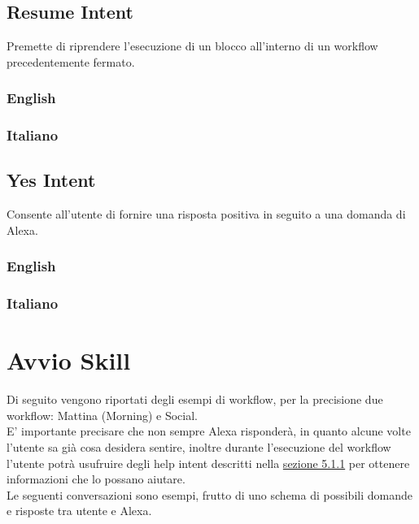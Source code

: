 \subsection{Resume Intent}
Premette di riprendere l'esecuzione di un blocco all'interno di un workflow precedentemente fermato.
\subsubsection{English}
\begin{itemize}
	
	
\end{itemize}

\subsubsection{Italiano}
\begin{itemize}
	
\end{itemize}



\subsection{Yes Intent}
Consente all'utente di fornire una risposta positiva in seguito a una domanda di Alexa.
\subsubsection{English}
\begin{itemize}
	
	
\end{itemize}

\subsubsection{Italiano}
\begin{itemize}
\end{itemize}

\section{Avvio Skill}
Di seguito vengono riportati degli esempi di workflow, per la precisione due workflow: Mattina (Morning) e Social. \\
E' importante precisare che non sempre Alexa risponderà, in quanto alcune volte l'utente sa già cosa desidera sentire, inoltre durante l'esecuzione del workflow l'utente potrà usufruire degli help intent descritti nella \hyperref[help]{sezione 5.1.1} per ottenere informazioni che lo possano aiutare. \\
Le seguenti conversazioni sono esempi, frutto di uno schema di possibili domande e risposte tra utente e Alexa.

